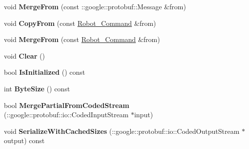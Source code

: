 \begin{DoxyCompactItemize}
\item 
\hypertarget{classvss__command_1_1Robot__Command_a72b9a2f6e5fcb0ee33f5c1a5782bb655}{void {\bfseries Merge\-From} (const \-::google\-::protobuf\-::\-Message \&from)}\label{classvss__command_1_1Robot__Command_a72b9a2f6e5fcb0ee33f5c1a5782bb655}

\item 
\hypertarget{classvss__command_1_1Robot__Command_a98f8965b27b6495b2d59dccd8d2bfe19}{void {\bfseries Copy\-From} (const \hyperlink{classvss__command_1_1Robot__Command}{Robot\-\_\-\-Command} \&from)}\label{classvss__command_1_1Robot__Command_a98f8965b27b6495b2d59dccd8d2bfe19}

\item 
\hypertarget{classvss__command_1_1Robot__Command_a48c5d39a8a3d31209db79aa77fcf876f}{void {\bfseries Merge\-From} (const \hyperlink{classvss__command_1_1Robot__Command}{Robot\-\_\-\-Command} \&from)}\label{classvss__command_1_1Robot__Command_a48c5d39a8a3d31209db79aa77fcf876f}

\item 
\hypertarget{classvss__command_1_1Robot__Command_aaffa12def3a1311252dcaccf6becb28b}{void {\bfseries Clear} ()}\label{classvss__command_1_1Robot__Command_aaffa12def3a1311252dcaccf6becb28b}

\item 
\hypertarget{classvss__command_1_1Robot__Command_af368ddcdb8103f40b21503727664fc52}{bool {\bfseries Is\-Initialized} () const }\label{classvss__command_1_1Robot__Command_af368ddcdb8103f40b21503727664fc52}

\item 
\hypertarget{classvss__command_1_1Robot__Command_a54599973bda6814c7842036eb9bf9229}{int {\bfseries Byte\-Size} () const }\label{classvss__command_1_1Robot__Command_a54599973bda6814c7842036eb9bf9229}

\item 
\hypertarget{classvss__command_1_1Robot__Command_a471b2b99a1e476866bdb6ded82d46274}{bool {\bfseries Merge\-Partial\-From\-Coded\-Stream} (\-::google\-::protobuf\-::io\-::\-Coded\-Input\-Stream $\ast$input)}\label{classvss__command_1_1Robot__Command_a471b2b99a1e476866bdb6ded82d46274}

\item 
\hypertarget{classvss__command_1_1Robot__Command_add920699d3f456d9335a4fbacf4a1fa5}{void {\bfseries Serialize\-With\-Cached\-Sizes} (\-::google\-::protobuf\-::io\-::\-Coded\-Output\-Stream $\ast$output) const }\label{classvss__command_1_1Robot__Command_add920699d3f456d9335a4fbacf4a1fa5}


\end{DoxyCompactItemize}
